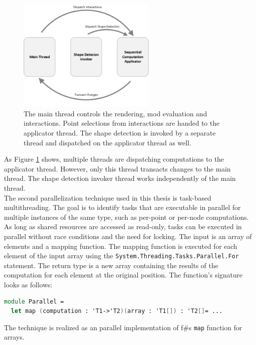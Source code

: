 \begin{figure}[b]
    \centering
    \includegraphics[width=0.6\textwidth]{Implementation/multiThreading.png}
    \caption{The main thread controls the rendering, mod evaluation and interactions. Point selections from interactions are handed to the applicator thread. The shape detection is invoked by a separate thread and dispatched on the applicator thread as well.  }
    \label{fig:multiThreading}
\end{figure}

As Figure \ref{fig:multiThreading} shows, multiple threads are dispatching computations to the applicator thread. However, only this thread transacts changes to the main thread. The shape detection invoker thread works independently of the main thread. 
\\

The second parallelization technique used in this thesis is task-based multithreading. The goal is to identify tasks that are executable in parallel for multiple instances of the same type, such as per-point or per-node computations. As long as shared resources are accessed as read-only, tasks can be executed in parallel without race conditions and the need for locking. The input is an array of elements and a mapping function. The mapping function is executed for each element of the input array using the \verb|System.Threading.Tasks.Parallel.For| statement. The return type is a new array containing the results of the computation for each element at the original position. The function's signature looks as follows: 
\\
\begin{lstlisting}[language = FSharp]
module Parallel = 
  let map (computation : 'T1->'T2)(array : 'T1[]) : 'T2[]= ...
\end{lstlisting}
The technique is realized as an parallel implementation of f\#s \verb|map| function for arrays. 

